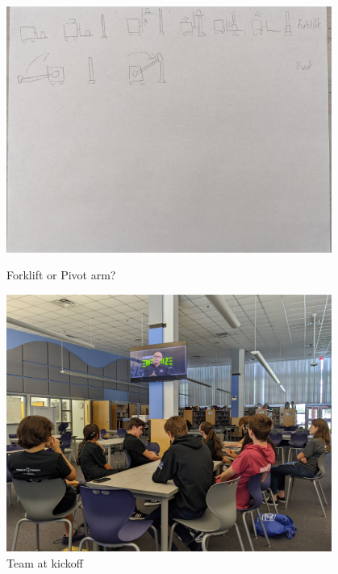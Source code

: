 \begin{figure}[ht]
\centering
\begin{minipage}[b]{.48\textwidth}
  \centering
  \includegraphics[width=0.95\textwidth]{Meetings/September/09-10-22/09-10-22-Design.jpg}
  \caption{Forklift or Pivot arm?}
  \label{fig:pic1}
\end{minipage}%

\hfill%
\begin{minipage}[b]{.48\textwidth}
  \centering
  \includegraphics[width=0.95\textwidth]{Meetings/September/09-10-22/09-10-22-Team.jpg}
  \caption{Team at kickoff}
  \label{fig:pic2}
\end{minipage}
\end{figure}

